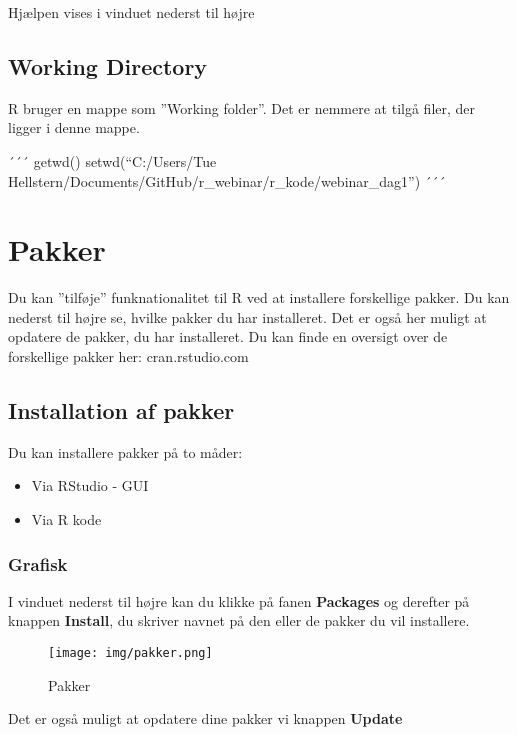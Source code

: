 \documentclass[
]{book}
\providecommand{\tightlist}{%
  \setlength{\itemsep}{0pt}\setlength{\parskip}{0pt}}
\begin{document}
Hjælpen vises i vinduet nederst til højre

\hypertarget{working-directory}{%
\section{Working Directory}\label{working-directory}}

R bruger en mappe som ''Working folder''. Det er nemmere at tilgå filer, der ligger i denne mappe.

´´´
getwd()
setwd(``C:/Users/Tue Hellstern/Documents/GitHub/r\_webinar/r\_kode/webinar\_dag1'')
´´´

\hypertarget{pakker}{%
\chapter{Pakker}\label{pakker}}

Du kan ''tilføje'' funknationalitet til R ved at installere forskellige pakker. Du kan nederst til højre se, hvilke pakker du har installeret.
Det er også her muligt at opdatere de pakker, du har installeret.
Du kan finde en oversigt over de forskellige pakker her: cran.rstudio.com

\hypertarget{installation-af-pakker}{%
\section{Installation af pakker}\label{installation-af-pakker}}

Du kan installere pakker på to måder:

\begin{itemize}
\tightlist
\item
  Via RStudio - GUI
\item
  Via R kode
\end{itemize}

\hypertarget{grafisk}{%
\subsection{Grafisk}\label{grafisk}}

I vinduet nederst til højre kan du klikke på fanen \textbf{Packages} og derefter på knappen \textbf{Install}, du skriver navnet på den eller de pakker du vil installere.

\begin{figure}
\centering
\texttt{[image: img/pakker.png]}
\caption{Pakker}
\end{figure}

Det er også muligt at opdatere dine pakker vi knappen \textbf{Update}
\end{document}
